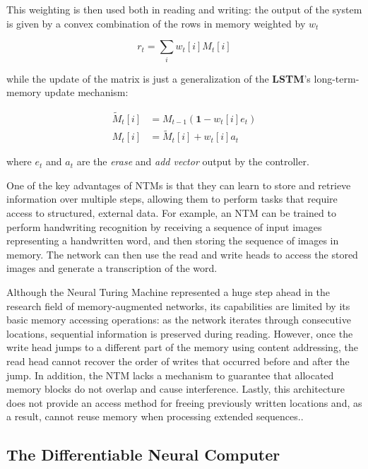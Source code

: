 \documentclass{article}
\begin{document}
This weighting is then used both in reading and writing: the output of the system is given by a convex combination of the rows in memory weighted by $w_t$

\begin{equation}
    r_t = \sum_i w_t[i]M_t[i]
\end{equation}

while the update of the matrix is just a generalization of the \textbf{LSTM}'s long-term-memory update mechanism:

\begin{align}
    \tilde{M}_t[i] &= M_{t-1}(\mathbf{1}-w_t[i] e_t)\\
    M_t[i] &= \tilde{M}_t[i] + w_t[i] a_t
\end{align}

where $e_t$ and $a_t$ are the \textit{erase} and \textit{add vector} output by the controller.

One of the key advantages of NTMs is that they can learn to store and retrieve information over multiple steps, allowing them to perform tasks that require access to structured, external data. For example, an NTM can be trained to perform handwriting recognition by receiving a sequence of input images representing a handwritten word, and then storing the sequence of images in memory. The network can then use the read and write heads to access the stored images and generate a transcription of the word.

Although the Neural Turing Machine represented a huge step ahead in the research field of memory-augmented networks, its capabilities are limited by its basic memory accessing operations: as the network iterates through consecutive locations, sequential information is preserved during reading. However, once the write head jumps to a different part of the memory using content addressing, the read head cannot recover the order of writes that occurred before and after the jump. In addition, the NTM lacks a mechanism to guarantee that allocated memory blocks do not overlap and cause interference. Lastly, this architecture does not provide an access method for freeing previously written locations and, as a result, cannot reuse memory when processing extended sequences..

\subsection{The Differentiable Neural Computer}
\end{document}
